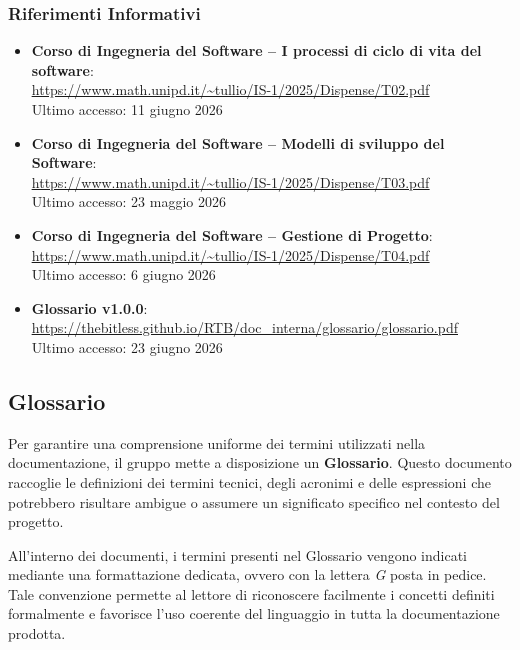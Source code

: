 ﻿\documentclass[a4paper, 10pt, colorlinks=true, linkcolor=black, urlcolor=blue, citecolor=blue, hidelinks]{article}
\newcommand{\reflink}[1]{{\footnotesize\underline{\url{#1}}}}
\begin{document}
\subsubsection{Riferimenti Informativi}
\begin{itemize}
    \item \textbf{Corso di Ingegneria del Software -- I processi di ciclo di vita del software}: \\
    \reflink{https://www.math.unipd.it/~tullio/IS-1/2025/Dispense/T02.pdf} \\
    Ultimo accesso: 11 giugno 2026

    \item \textbf{Corso di Ingegneria del Software -- Modelli di sviluppo del Software}: \\
    \reflink{https://www.math.unipd.it/~tullio/IS-1/2025/Dispense/T03.pdf} \\
    Ultimo accesso: 23 maggio 2026

    \item \textbf{Corso di Ingegneria del Software -- Gestione di Progetto}: \\
    \reflink{https://www.math.unipd.it/~tullio/IS-1/2025/Dispense/T04.pdf} \\
    Ultimo accesso: 6 giugno 2026

    \item \textbf{Glossario v1.0.0}: \\
    \reflink{https://thebitless.github.io/RTB/doc_interna/glossario/glossario.pdf} \\
    Ultimo accesso: 23 giugno 2026
\end{itemize}

\subsection{Glossario}

Per garantire una comprensione uniforme dei termini utilizzati nella documentazione, il gruppo mette a disposizione un \textbf{Glossario}. Questo documento raccoglie le definizioni dei termini tecnici, degli acronimi e delle espressioni che potrebbero risultare ambigue o assumere un significato specifico nel contesto del progetto.

All'interno dei documenti, i termini presenti nel Glossario vengono indicati mediante una formattazione dedicata, ovvero con la lettera \textit{G} posta in pedice. Tale convenzione permette al lettore di riconoscere facilmente i concetti definiti formalmente e favorisce l'uso coerente del linguaggio in tutta la documentazione prodotta.
\end{document}

